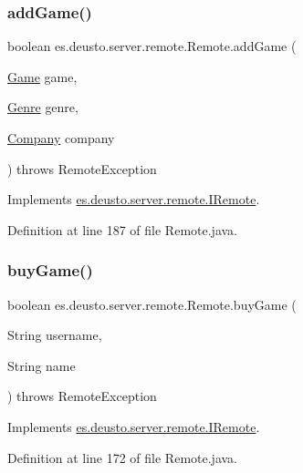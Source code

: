 \subsubsection{\texorpdfstring{add\+Game()}{addGame()}}
{\footnotesize\ttfamily boolean es.\+deusto.\+server.\+remote.\+Remote.\+add\+Game (\begin{DoxyParamCaption}\item[{\hyperlink{classes_1_1deusto_1_1server_1_1db_1_1data_1_1_game}{Game}}]{game,  }\item[{\hyperlink{classes_1_1deusto_1_1server_1_1db_1_1data_1_1_genre}{Genre}}]{genre,  }\item[{\hyperlink{classes_1_1deusto_1_1server_1_1db_1_1data_1_1_company}{Company}}]{company }\end{DoxyParamCaption}) throws Remote\+Exception}



Implements \hyperlink{interfacees_1_1deusto_1_1server_1_1remote_1_1_i_remote_a1875223271b9ce7a29a835fee12e735b}{es.\+deusto.\+server.\+remote.\+I\+Remote}.



Definition at line 187 of file Remote.\+java.

\mbox{\label{classes_1_1deusto_1_1server_1_1remote_1_1_remote_ad9f8ad426b1162504b7b39eb1c86d2a3}} 
\subsubsection{\texorpdfstring{buy\+Game()}{buyGame()}}
{\footnotesize\ttfamily boolean es.\+deusto.\+server.\+remote.\+Remote.\+buy\+Game (\begin{DoxyParamCaption}\item[{String}]{username,  }\item[{String}]{name }\end{DoxyParamCaption}) throws Remote\+Exception}



Implements \hyperlink{interfacees_1_1deusto_1_1server_1_1remote_1_1_i_remote_ad2e6ee616bdc780b4057e63bf2ae8be7}{es.\+deusto.\+server.\+remote.\+I\+Remote}.



Definition at line 172 of file Remote.\+java.

